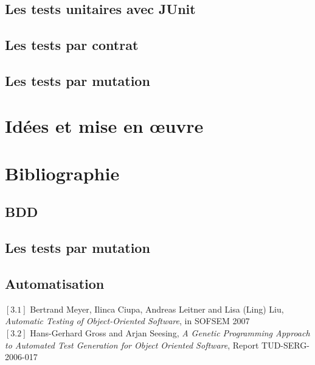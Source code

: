 \documentclass[a4paper]{report}
\begin{document}
\section*{Les tests unitaires avec JUnit}
\section*{Les tests par contrat}
\section*{Les tests par mutation}




\chapter*{Idées et mise en œuvre}

\chapter*{Bibliographie}
\section*{BDD}

\section*{Les tests par mutation}

\section*{Automatisation}

$[3.1]$ Bertrand Meyer, Ilinca Ciupa, Andreas Leitner and Lisa (Ling) Liu, \textit{Automatic Testing of Object-Oriented Software}, in SOFSEM 2007\\
$[3.2]$ Hans-Gerhard Gross and Arjan Seesing, 
\textit{A Genetic Programming Approach to Automated Test Generation for Object Oriented Software}, Report TUD-SERG-2006-017
\end{document}
